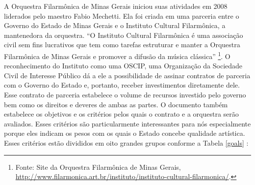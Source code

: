 \documentclass[a4paper, 12pt, openright, oneside, german, french, english, brazil]{abntex2}
\begin{document}
	A Orquestra Filarmônica de Minas Gerais iniciou suas atividades em 2008 liderados pelo maestro Fabio Mechetti. Ela foi criada em uma parceria entre o Governo do Estado de Minas Gerais e o Instituto Cultural Filarmônica, a mantenedora da orquestra. ``O Instituto Cultural Filarmônica é uma associação civil sem fins lucrativos que tem como tarefas estruturar e manter a Orquestra Filarmônica de Minas Gerais e promover a difusão da música clássica'' \footnote{Fonte: Site da Orquestra Filarmônica de Minas Gerais, \url{http://www.filarmonica.art.br/instituto/instituto-cultural-filarmonica/}.}. O reconhecimento do Instituto como uma OSCIP, uma Organização da Sociedade Civil de Interesse Público dá a ele a possibilidade de assinar contratos de parceria \cite{minas2017aditivo} com o Governo do Estado e, portanto, receber investimentos diretamente dele. Esse contrato de parceria estabelece o volume de recursos investido pelo governo bem como os direitos e deveres de ambas as partes. O documento também estabelece os objetivos e os critérios pelos quais o contrato e a orquestra serão avaliados. Esses critérios são particularmente interessantes para nós especialmente porque eles indicam os pesos com os quais o Estado concebe qualidade artística.  Esses critérios estão divididos em oito grandes grupos conforme a Tabela \ref{goals} \cite{filarmonica2017gerencial}:
	
	
	
	
	
\end{document}
